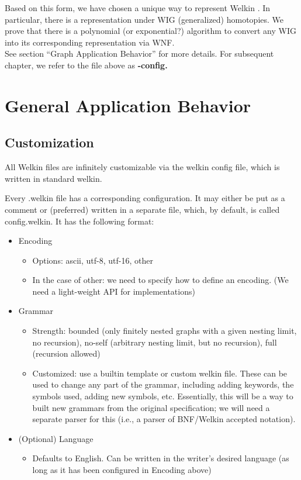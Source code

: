 Based on this form, we have chosen a unique way to represent Welkin . In particular, there is a representation under WIG (generalized) homotopies. We prove that there is a polynomial (or exponential?) algorithm to convert any WIG into its corresponding representation via WNF.
\\ See section ``Graph Application Behavior'' for more details. For subsequent chapter, we refer to the file above as \textbf{-config.}


\section{General Application Behavior}


\subsection{Customization}
All Welkin files are infinitely customizable via the welkin config file, which is written in standard welkin.

Every .welkin file has a corresponding configuration. It may either be put as a comment or (preferred) written in a separate file, which, by default, is called config.welkin. It has the following format:
\begin{itemize}
	\item Encoding
				\begin{itemize}
					\item Options: ascii, utf-8, utf-16, other
					\item In the case of other: we need to specify how to define an encoding. (We need a light-weight API for implementations)
				\end{itemize}
	\item Grammar
				\begin{itemize}
					\item Strength: bounded (only finitely nested graphs with a given nesting limit, no recursion), no-self (arbitrary nesting limit, but no recursion), full (recursion allowed)
					\item Customized: use a builtin template or custom welkin file. These can be used to change any part of the grammar, including adding keywords, the symbols used, adding new symbols, etc. Essentially, this will be a way to built new grammars from the original specification; we will need a separate parser for this (i.e., a parser of BNF/Welkin accepted notation).
				\end{itemize}

	\item (Optional) Language
				\begin{itemize}
					\item Defaults to English. Can be written in the writer's desired language (as long as it has been configured in Encoding above)
				\end{itemize}
\end{itemize}


